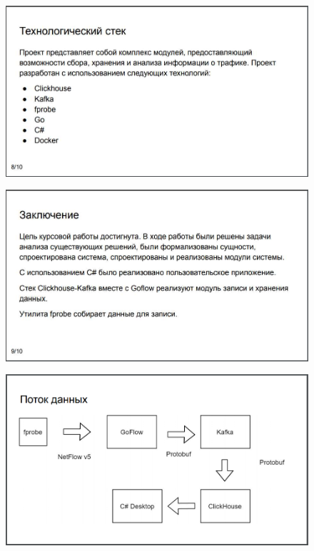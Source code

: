 \begin{figure}[H]
	\centering
	\includegraphics[scale=0.35]{pr8.jpg}
\end{figure}
\begin{figure}[H]
	\centering
	\includegraphics[scale=0.35]{pr9.jpg}
\end{figure}
\begin{figure}[H]
	\centering
	\includegraphics[scale=0.35]{prf.png}
\end{figure}
